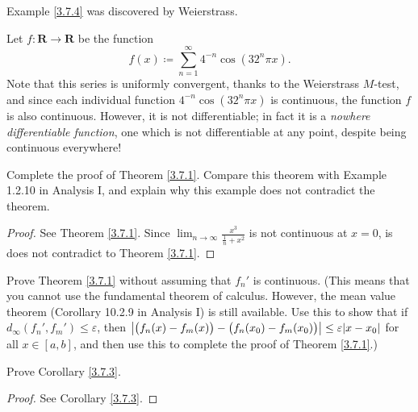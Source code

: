 \begin{note}
    Example \ref{3.7.4} was discovered by Weierstrass.
\end{note}

\begin{example}\label{3.7.4}
    Let \(f : \mathbf{R} \to \mathbf{R}\) be the function
    \[
        f(x) \coloneqq \sum_{n = 1}^\infty 4^{-n} \cos(32^n \pi x).
    \]
    Note that this series is uniformly convergent, thanks to the Weierstrass \(M\)-test, and since each individual function \(4^{-n} \cos(32^n \pi x)\) is continuous, the function \(f\) is also continuous.
    However, it is not differentiable;
    in fact it is a \emph{nowhere differentiable function}, one which is not differentiable at any point, despite being continuous everywhere!
\end{example}

\exercisesection

\begin{exercise}\label{ex 3.7.1}
    Complete the proof of Theorem \ref{3.7.1}.
    Compare this theorem with Example 1.2.10 in Analysis I, and explain why this example does not contradict the theorem.
\end{exercise}

\begin{proof}
    See Theorem \ref{3.7.1}.
    Since \(\lim_{n \to \infty} \frac{x^3}{\frac{1}{n} + x^2}\) is not continuous at \(x = 0\), is does not contradict to Theorem \ref{3.7.1}.
\end{proof}

\begin{exercise}\label{ex 3.7.2}
    Prove Theorem \ref{3.7.1} without assuming that \(f_n'\) is continuous.
    (This means that you cannot use the fundamental theorem of calculus.
    However, the mean value theorem (Corollary 10.2.9 in Analysis I) is still available.
    Use this to show that if \(d_\infty(f_n', f_m') \leq \varepsilon\), then \(\abs*{\big(f_n(x) - f_m(x)\big) - \big(f_n(x_0) - f_m(x_0)\big)} \leq \varepsilon \abs*{x - x_0}\) for all \(x \in [a, b]\), and then use this to complete the proof of Theorem \ref{3.7.1}.)
\end{exercise}

\begin{exercise}\label{ex 3.7.3}
    Prove Corollary \ref{3.7.3}.
\end{exercise}

\begin{proof}
    See Corollary \ref{3.7.3}.
\end{proof}
